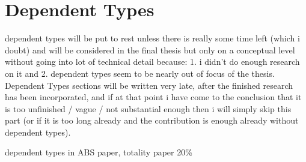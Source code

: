 \chapter{Dependent Types}
dependent types will be put to rest unless there is really some time left (which i doubt) and will be considered in the final thesis but only on a conceptual level without going into lot of technical detail because: 1. i didn't do enough research on it and 2. dependent types seem to be nearly out of focus of the thesis. Dependent Types sections will be written very late, after the finished research has been incorporated, and if at that point i have come to the conclusion that it is too unfinished / vague / not substantial enough then i will simply skip this part (or if it is too long already and the contribution is enough already without dependent types).


dependent types in ABS paper, totality paper
20\%

